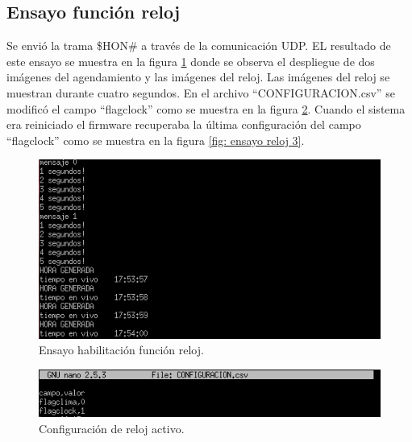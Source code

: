 \subsection{Ensayo función reloj}

Se envió la trama \$HON\# a través de la comunicación UDP. EL resultado de este ensayo se muestra en la figura \ref{fig: ensayo reloj 1} donde se observa el despliegue de dos imágenes del agendamiento y las imágenes del reloj. Las imágenes del reloj se muestran durante cuatro segundos. En el archivo ``CONFIGURACION.csv'' se modificó el campo ``flagclock'' como se muestra en la figura \ref{fig: ensayo reloj 2}. Cuando el sistema era reiniciado el firmware recuperaba la última configuración del campo ``flagclock'' como se muestra en la figura \ref{fig: ensayo reloj 3}. 

\begin{figure}[htpb]
	\centering
	\includegraphics[scale=0.8]{Figures/pruebareloj1.png} 
	\caption{Ensayo habilitación función reloj.}
	\label{fig: ensayo reloj 1}
\end{figure}

\begin{figure}[htpb]
	\centering
	\includegraphics[scale=0.8]{Figures/pruebareloj2.png} 
	\caption{Configuración de reloj activo.}
	\label{fig: ensayo reloj 2}
\end{figure}

